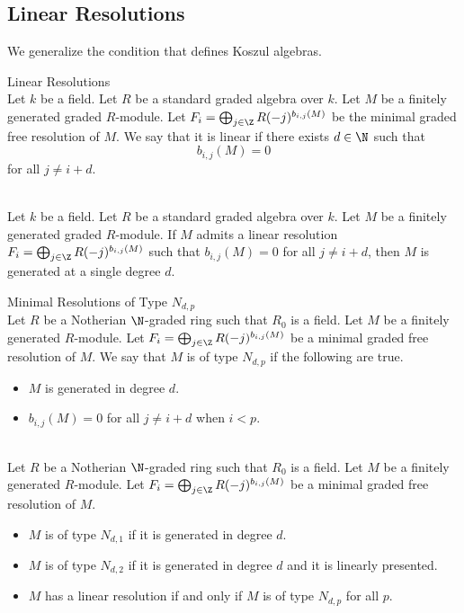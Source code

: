 \documentclass[a4paper]{article}
\begin{document}
\subsection{Linear Resolutions}
We generalize the condition that defines Koszul algebras. 

\begin{defn}{Linear Resolutions}{}\\
Let $k$ be a field. Let $R$ be a standard graded algebra over $k$. Let $M$ be a finitely generated graded $R$-module. Let $F_i=\bigoplus_{j\in\Z}R(-j)^{b_{i,j}(M)}$ be the minimal graded free resolution of $M$. We say that it is linear if there exists $d\in\N$ such that $$b_{i,j}(M)=0$$ for all $j\neq i+d$. 
\end{defn}

\begin{lmm}{}{}\\
Let $k$ be a field. Let $R$ be a standard graded algebra over $k$. Let $M$ be a finitely generated graded $R$-module. If $M$ admits a linear resolution $F_i=\bigoplus_{j\in\Z}R(-j)^{b_{i,j}(M)}$ such that $b_{i,j}(M)=0$ for all $j\neq i+d$, then $M$ is generated at a single degree $d$. 
\end{lmm}

\begin{defn}{Minimal Resolutions of Type $N_{d,p}$}{}\\
Let $R$ be a Notherian $\N$-graded ring such that $R_0$ is a field. Let $M$ be a finitely generated $R$-module. Let $F_i=\bigoplus_{j\in\Z}R(-j)^{b_{i,j}(M)}$ be a minimal graded free resolution of $M$. We say that $M$ is of type $N_{d,p}$ if the following are true. 
\begin{itemize}
\item $M$ is generated in degree $d$. 
\item $b_{i,j}(M)=0$ for all $j\neq i+d$ when $i<p$. 
\end{itemize}
\end{defn}

\begin{eg}{}{}\\
Let $R$ be a Notherian $\N$-graded ring such that $R_0$ is a field. Let $M$ be a finitely generated $R$-module. Let $F_i=\bigoplus_{j\in\Z}R(-j)^{b_{i,j}(M)}$ be a minimal graded free resolution of $M$. 
\begin{itemize}
\item $M$ is of type $N_{d,1}$ if it is generated in degree $d$. 
\item $M$ is of type $N_{d,2}$ if it is generated in degree $d$ and it is linearly presented. 
\item $M$ has a linear resolution if and only if $M$ is of type $N_{d,p}$ for all $p$. 
\end{itemize}
\end{eg}
\end{document}
